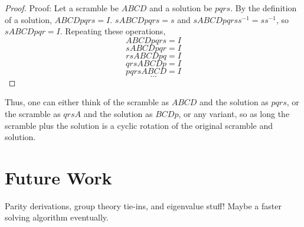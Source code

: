 \documentclass[11pt, oneside]{article}
\theoremstyle{plain}
\begin{document}
\begin{proof}
Proof: Let a scramble be \( ABCD \) and a solution be \( pqrs \).
By the definition of a solution, \( ABCDpqrs = I \).
\( sABCDpqrs = s \) and \( sABCDpqrss^{-1} = ss^{-1} \), so
\( sABCDpqr = I \).
Repeating these operations,
\[ ABCDpqrs = I \]
\[ sABCDpqr = I \]
\[ rsABCDpq = I \]
\[ qrsABCDp = I \]
\[ pqrsABCD = I \]
\[ \dots \]
\end{proof}

Thus, one can either think of the scramble as \( ABCD \) and the solution as
\( pqrs \), or the scramble as \( qrsA \) and the solution as \( BCDp \),
or any variant, so as long the scramble plus the solution is a cyclic rotation of the original scramble and solution.

\section{Future Work}

Parity derivations, group theory tie-ins, and eigenvalue stuff!
Maybe a faster solving algorithm eventually.
\end{document}
